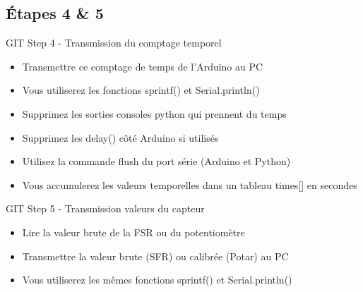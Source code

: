 \documentclass[a4paper,11pt]{beamer}
\begin{document}
\subsection{Étapes 4 \& 5}
\begin{frame}
\begin{exampleblock}{GIT Step 4 - Transmission du comptage temporel}
\begin{itemize}
\item Transmettre ce comptage de temps de l'Arduino au PC
\item Vous utiliserez les fonctions sprintf() et Serial.println()
\item Supprimez les sorties consoles python qui prennent du temps
\item Supprimez les delay() côté Arduino si utilisés
\item Utilisez la commande flush du port série (Arduino et Python)
\item Vous accumulerez les valeurs temporelles dans un tableau times[] en secondes
\end{itemize}
\end{exampleblock}
\begin{exampleblock}{GIT Step 5 - Transmission valeurs du capteur}
\begin{itemize}
\item Lire la valeur brute de la FSR ou du potentiomètre
\item Transmettre la valeur brute (SFR) ou calibrée (Potar) au PC
\item Vous utiliserez les mêmes fonctions sprintf() et Serial.println()
\end{itemize}
\end{exampleblock}
\end{frame}
\end{document}
